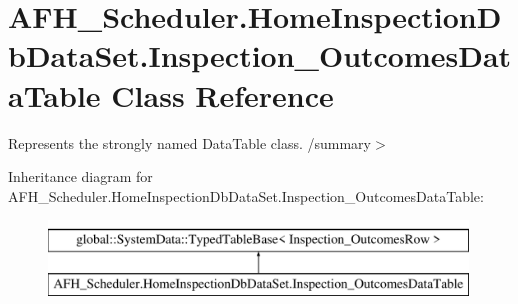 \section{A\+F\+H\+\_\+\+Scheduler.\+Home\+Inspection\+Db\+Data\+Set.\+Inspection\+\_\+\+Outcomes\+Data\+Table Class Reference}
\label{class_a_f_h___scheduler_1_1_home_inspection_db_data_set_1_1_inspection___outcomes_data_table}


Represents the strongly named Data\+Table class. /summary$>$  


Inheritance diagram for A\+F\+H\+\_\+\+Scheduler.\+Home\+Inspection\+Db\+Data\+Set.\+Inspection\+\_\+\+Outcomes\+Data\+Table\+:\begin{figure}[H]
\begin{center}
\leavevmode
\includegraphics[height=2.000000cm]{class_a_f_h___scheduler_1_1_home_inspection_db_data_set_1_1_inspection___outcomes_data_table}
\end{center}
\end{figure}
